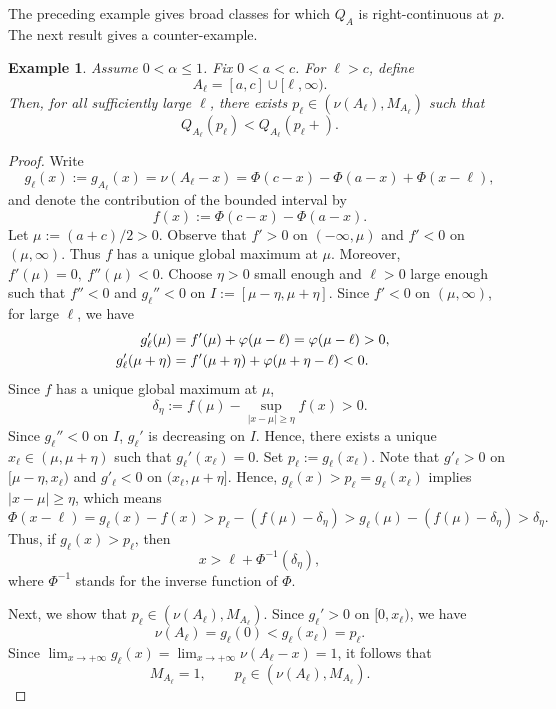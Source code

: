 \documentclass[a4paper, 11pt]{article}
\newcommand{\1}{\mathbf 1}
\theoremstyle{plain}
\newtheorem{example}{Example}[section]
\begin{document}
The preceding example gives broad classes for which \(Q_A\) is right-continuous at $p$. The next
result gives a counter-example.

\begin{example}
\label{prop:genuine-jump}
Assume \(0<\alpha\leq1\). Fix \(0<a<c\). For
\(\ell>c\), define
\[
  A_\ell=[a,c]\cup[\ell,\infty).
\]
Then, for all sufficiently large \(\ell\), there exists
\(p_\ell\in(\nu(A_\ell),M_{A_\ell})\) such that
\[
  Q_{A_\ell}(p_\ell)<Q_{A_\ell}(p_\ell+).
\]
\end{example}

\begin{proof}
Write
\[
  g_\ell(x):=g_{A_\ell}(x)
  =\nu(A_{\ell}-x)=\Phi(c-x)-\Phi(a-x)+\Phi(x-\ell),
\]
and denote the contribution of the bounded interval by
\[
  f(x):=\Phi(c-x)-\Phi(a-x).
\]
Let $\mu:=(a+c)/2>0.$ Observe that \(f'>0\) on \((-\infty,\mu)\) and \(f'<0\) on
\((\mu,\infty)\). Thus \(f\) has a unique global maximum at \(\mu\).
Moreover, $f'(\mu)=0,~f''(\mu)<0.$ Choose \(\eta>0\) small enough and $\ell>0$ large enough such that \(f''<0\) and $g_\ell''<0$ on
\(I:=[\mu-\eta,\mu+\eta]\). Since $f'<0$ on $(\mu,\infty)$, for large $\ell$, we have
\begin{align}
  g_\ell'(\mu)&=f'(\mu)+\varphi(\mu-\ell)=\varphi(\mu-\ell)>0,\cr
  g_\ell'(\mu+\eta)&=f'(\mu+\eta)+\varphi(\mu+\eta-\ell)<0.\nonumber
\end{align}
 Since \(f\) has a unique global maximum at \(\mu\),
\[
  \delta_\eta
  :=f(\mu)-\sup_{|x-\mu|\geq\eta}f(x)>0.
\]
Since $g_\ell''<0$ on $I$, $g_\ell'$ is decreasing on $I$. Hence, there exists a unique \(x_\ell\in(\mu,\mu+\eta)\) such that \(g_\ell'(x_\ell)=0\). Set \(p_\ell:=g_\ell(x_\ell)\). Note that $g'_\ell>0$ on  $[\mu-\eta,x_\ell)$ and  $g'_\ell<0$ on $(x_\ell,\mu+\eta]$. Hence, \(g_\ell(x)>p_\ell=g_\ell(x_\ell)\) implies \(|x-\mu|\geq \eta\), which means
\[
  \Phi(x-\ell)
  =g_\ell(x)-f(x)
  >p_\ell-(f(\mu)-\delta_\eta)>g_\ell(\mu)-(f(\mu)-\delta_\eta)
  >\delta_\eta.
\]
Thus, if \(g_\ell(x)>p_\ell\), then
\begin{equation}\label{eq:jump-superlevel-location}
  x>\ell+\Phi^{-1}(\delta_\eta),
\end{equation}
where $\Phi^{-1}$ stands for the inverse function of $\Phi$.
\par
Next, we show that $p_\ell\in(\nu(A_\ell),M_{A_\ell})$. Since $g_\ell'>0$ on $[0,x_\ell)$, we have
\[
  \nu(A_\ell)
  =g_\ell(0)
  <g_\ell(x_\ell)
  =p_\ell.
\]
Since
\(\lim_{x\to+\infty}g_\ell(x)=\lim_{x\to+\infty}\nu(A_{\ell}-x)=1\), it follows that
\[
  M_{A_\ell}=1,
  \qquad
  p_\ell\in(\nu(A_\ell),M_{A_\ell}).
\]
\par



\end{proof}
\end{document}
